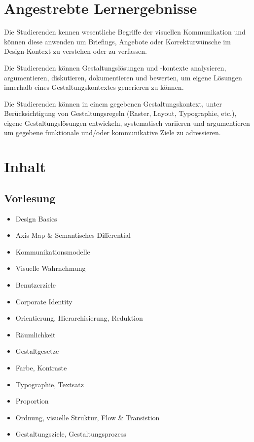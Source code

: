 \hypertarget{angestrebte-lernergebnissepathlabelmi-2017modulbeschreibungen-bachelorba_screendesign}{%
\section*{Angestrebte
Lernergebnisse\label{/mi-2017/modulbeschreibungen-bachelor/BA_Screendesign}}\label{angestrebte-lernergebnissepathlabelmi-2017modulbeschreibungen-bachelorba_screendesign}}

Die Studierenden kennen wesentliche Begriffe der visuellen Kommunikation
und können diese anwenden um Briefings, Angebote oder Korrekturwünsche
im Design-Kontext zu verstehen oder zu verfassen.

Die Studierenden können Gestaltungslösungen und -kontexte analysieren,
argumentieren, diskutieren, dokumentieren und bewerten, um eigene
Lösungen innerhalb eines Gestaltungskontextes generieren zu können.

Die Studierenden können in einem gegebenen Gestaltungskontext, unter
Berücksichtigung von Gestaltungsregeln (Raster, Layout, Typographie,
etc.), eigene Gestaltungslösungen entwickeln, systematisch variieren und
argumentieren um gegebene funktionale und/oder kommunikative Ziele zu
adressieren.

\hypertarget{inhaltpathlabelmi-2017modulbeschreibungen-bachelorba_screendesign}{%
\section*{Inhalt\label{/mi-2017/modulbeschreibungen-bachelor/BA_Screendesign}}\label{inhaltpathlabelmi-2017modulbeschreibungen-bachelorba_screendesign}}

\hypertarget{vorlesungpathlabelmi-2017modulbeschreibungen-bachelorba_screendesign}{%
\subsection*{Vorlesung\label{/mi-2017/modulbeschreibungen-bachelor/BA_Screendesign}}\label{vorlesungpathlabelmi-2017modulbeschreibungen-bachelorba_screendesign}}

\begin{itemize}
\tightlist
\item
  Design Basics
\item
  Axis Map \& Semantisches Differential
\item
  Kommunikationsmodelle
\item
  Visuelle Wahrnehmung
\item
  Benutzerziele
\item
  Corporate Identity
\item
  Orientierung, Hierarchisierung, Reduktion
\item
  Räumlichkeit
\item
  Gestaltgesetze
\item
  Farbe, Kontraste
\item
  Typographie, Textsatz
\item
  Proportion
\item
  Ordnung, visuelle Struktur, Flow \& Transistion
\item
  Gestaltungsziele, Gestaltungsprozess
\end{itemize}

